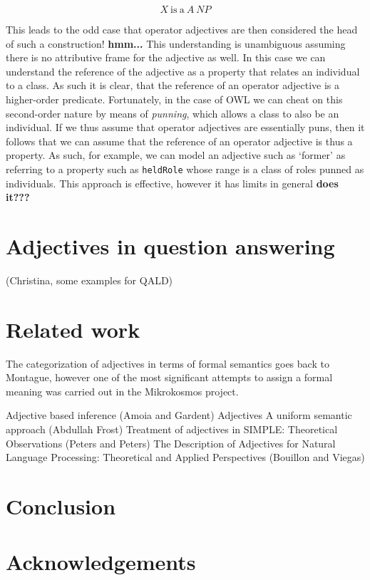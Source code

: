 \documentclass[11pt]{article}
\begin{document}
$$X\mathrm{~is~a~}A~NP$$

This leads to the odd case that operator adjectives are then considered the head of such a construction! \textbf{hmm...} This understanding is unambiguous assuming there is no attributive frame for the adjective as well. In this case we can understand the reference of the adjective as a property that relates an individual to a class. As such it is clear, that the reference of an operator adjective is a higher-order predicate. Fortunately, in the case of OWL we can cheat on this second-order nature by means of \emph{punning}, which allows a class to also be an individual. If we thus assume that operator adjectives are essentially puns, then it follows that we can assume that the reference of an operator adjective is thus a property. As such, for example, we can model an adjective such as `former' as referring to a property such as {\tt heldRole} whose range is a class of roles punned as individuals. This approach is effective, however it has limits in general \textbf{does it???}

\section{Adjectives in question answering}

(Christina, some examples for QALD)

\section{Related work}

The categorization of adjectives in terms of formal semantics goes back to Montague, however one of the most significant attempts to assign a formal meaning was carried out in the Mikrokosmos project\cite{raskin1995lexical}. 


Adjective based inference (Amoia and Gardent)
Adjectives A uniform semantic approach (Abdullah Frost)
Treatment of adjectives in SIMPLE: Theoretical Observations (Peters and Peters)
The Description of Adjectives for Natural Language Processing: Theoretical and Applied Perspectives (Bouillon and Viegas)


\section{Conclusion}

\section*{Acknowledgements}



\end{document}
